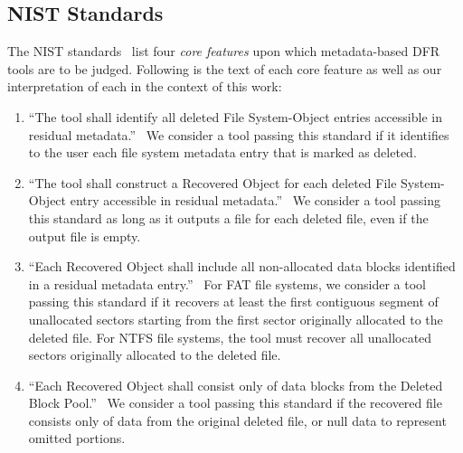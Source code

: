 \subsection{NIST Standards}
The NIST standards~\cite{meta:dfr:standards} list four \emph{core features} upon which metadata-based DFR tools are to be judged.
Following is the text of each core feature as well as our interpretation of each in the context of this work:
\begin{enumerate}
 \item ``The tool shall identify all deleted File System-Object entries accessible in residual metadata.''~\cite{meta:dfr:standards}
 We consider a tool passing this standard if it identifies to the user each file system metadata entry that is marked as deleted.
 \item ``The tool shall construct a Recovered Object for each deleted File System-Object entry accessible in residual metadata.''~\cite{meta:dfr:standards}
 We consider a tool passing this standard as long as it outputs a file for each deleted file, even if the output file is empty.
 \item ``Each Recovered Object shall include all non-allocated data blocks identified in a residual metadata entry.''~\cite{meta:dfr:standards}
 For FAT file systems, we consider a tool passing this standard if it recovers at least the first contiguous segment of unallocated sectors starting from the first sector originally allocated to the deleted file. For NTFS file systems, the tool must recover all unallocated sectors originally allocated to the deleted file.
 \item ``Each Recovered Object shall consist only of data blocks from the Deleted Block Pool.''~\cite{meta:dfr:standards}
 We consider a tool passing this standard if the recovered file consists only of data from the original deleted file, or null data to represent omitted portions.
\end{enumerate}


